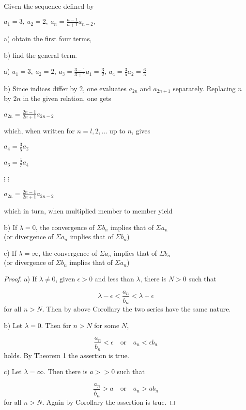 \documentclass[11pt]{amsbook}
\begin{document}
  \begin{exmp}
  Given the sequence defined by 
    \begin{center}
    $a_1 = 3, \ a_2 = 2, \ a_n = \frac{n-1}{n+1}a_{n-2},$
    \end{center}
  a) obtain the first four terms,
  
  \noindent b) find the general term.
  \end{exmp}
  
  \begin{hSolution}
  a) $a_1 = 3, \ a_2 = 2, \ a_3 = \frac{3-1}{3+1}a_1 = \frac{3}{2}, \ a_4 = \frac{3}{5}a_2 = \frac{6}{5}$

  \noindent b) Since indices differ by 2, one evaluates $a_{2n}$ and $a_{2n+1}$ separately. 
  Replacing $n$ by $2n$ in the given relation, one gets  %
    \begin{center}
    $a_{2n} = \frac{2n-1}{2n+1}a_{2n-2}$
    \end{center}
  which, when written for $n  = l, 2, ...$ up to $n$, gives 
    \begin{center}
    $a_4 = \frac{3}{5}a_2$

    $a_6 = \frac{5}{7}a_4$

    $\vdots$ \qquad $\vdots$

    $a_{2n} = \frac{2n-1}{2n+1}a_{2n-2}$
    \end{center}
  which in turn, when multiplied member to member yield 
  \end{hSolution} %
	b) If $\lambda = 0$, the convergence of $\Sigma b_n$ implies that of $\Sigma a_n$ \\(or divergence of $\Sigma a_n$ implies that of $\Sigma b_n$)

	c) If $\lambda = \infty$, the convergence of $\Sigma a_n$ implies that of $\Sigma b_n$ \\(or divergence of $\Sigma b_n$ implies that of $\Sigma a_n$)
	
	\begin{proof}
	a) If $\lambda \neq 0$, given $\epsilon>0$ and less than $\lambda$, there is $N>0$ such that
	
		$$\lambda - \epsilon < \frac{a_n}{b_n} < \lambda + \epsilon$$ for all $n>N$.
	Then by above Corollary the two series have the same nature.
	
	b) Let $\lambda = 0$. Then for $n>N$ for some $N$,
	
		$$ \frac{a_n}{b_n}<\epsilon \quad \text{or} \quad a_n < \epsilon b_n$$
	holds. By Theorem 1 the assertion is true.
	
	c) Let $\lambda = \infty$. Then there is $a>>0$ such that
		
		$$ \frac{a_n}{b_n} > a \quad \text{or}\quad a_n > a b_n$$
	for all $n>N$. Again by Corollary the assertion is true.	
	\end{proof}
	
\end{document}
